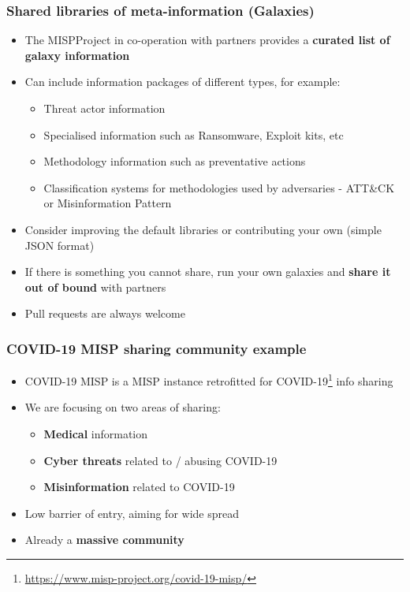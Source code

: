 \begin{frame}
\frametitle{Shared libraries of meta-information (Galaxies)}
\begin{itemize}
    \item The MISPProject in co-operation with partners provides a {\bf curated list of galaxy information}
	\item Can include information packages of different types, for example:
	\begin{itemize}
		\item Threat actor information
		\item Specialised information such as Ransomware, Exploit kits, etc
		\item Methodology information such as preventative actions
		\item Classification systems for methodologies used by adversaries - ATT\&CK or Misinformation Pattern
	\end{itemize}
	\item Consider improving the default libraries or contributing your own (simple JSON format)
    \item If there is something you cannot share, run your own galaxies and {\bf share it out of bound} with partners
	\item Pull requests are always welcome
\end{itemize}
\end{frame}


\begin{frame}
 \frametitle{COVID-19 MISP sharing community example}
 \begin{itemize}
         \item COVID-19 MISP is a MISP instance retrofitted for COVID-19\footnote{\url{https://www.misp-project.org/covid-19-misp/}} info sharing
         \item We are focusing on two areas of sharing:
         \begin{itemize}
              \item {\bf Medical} information
              \item {\bf Cyber threats} related to / abusing COVID-19
              \item {\bf Misinformation} related to COVID-19
         \end{itemize}
         \item Low barrier of entry, aiming for wide spread
         \item Already a {\bf massive community}
 \end{itemize}
\end{frame}

